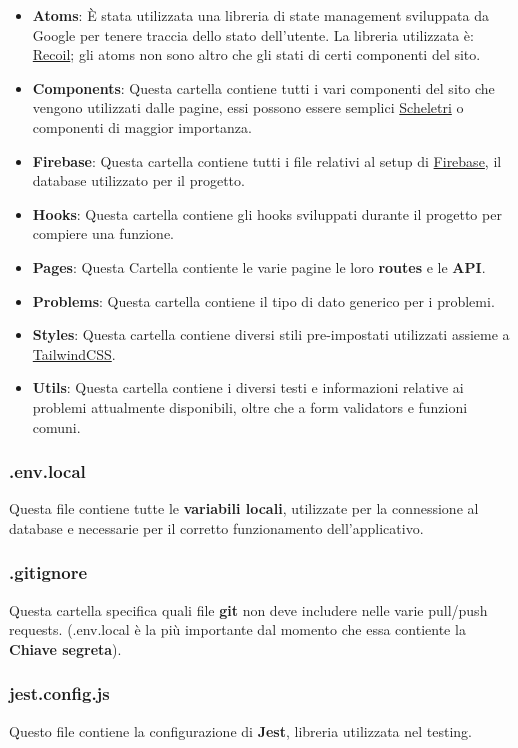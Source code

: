 \documentclass[11pt, a4paper]{article}
\theoremstyle{definition}
\begin{document}
\begin{itemize}
  \item \textbf{Atoms}: È stata utilizzata una libreria di state management sviluppata da Google per tenere traccia dello stato dell'utente. La libreria utilizzata è: \href{https://recoiljs.org/}{Recoil}; gli atoms non sono altro che gli stati di certi componenti del sito.
  \item \textbf{Components}: Questa cartella contiene tutti i vari componenti del sito che vengono utilizzati dalle pagine, essi possono essere semplici \href{https://www.nngroup.com/articles/skeleton-screens/}{Scheletri} o componenti di maggior importanza.
  \item \textbf{Firebase}: Questa cartella contiene tutti i file relativi al setup di \href{https://firebase.google.com/}{Firebase}, il database utilizzato per il progetto.
  \item \textbf{Hooks}: Questa cartella contiene gli hooks sviluppati durante il progetto per compiere una funzione.
  \item \textbf{Pages}: Questa Cartella contiente le varie pagine le loro \textbf{routes} e le \textbf{API}.
  \item \textbf{Problems}: Questa cartella contiene il tipo di dato generico per i problemi.
  \item \textbf{Styles}: Questa cartella contiene diversi stili pre-impostati utilizzati assieme a \href{https://tailwindcss.com/}{TailwindCSS}.
  \item \textbf{Utils}: Questa cartella contiene i diversi testi e informazioni relative ai problemi attualmente disponibili, oltre che a form validators e funzioni comuni.
\end{itemize}

\subsubsection{.env.local}
Questa file contiene tutte le \textbf{variabili locali}, utilizzate per la connessione al database e necessarie per il corretto funzionamento dell'applicativo.
\subsubsection{.gitignore}
Questa cartella specifica quali file \textbf{git} non deve includere nelle varie pull/push requests. (.env.local è la più importante dal momento che essa contiente la \textbf{Chiave segreta}).
\subsubsection{jest.config.js}
Questo file contiene la configurazione di \textbf{Jest}, libreria utilizzata nel testing.
\end{document}

